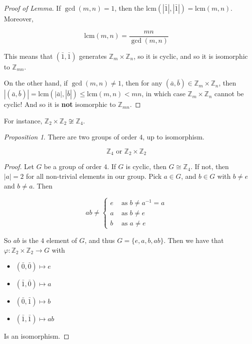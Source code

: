 \documentclass[12pt]{article}
\def\lcm{\text{lcm}}
\def\Z{{\mathbb Z}}
\theoremstyle{remark}
\newtheorem{proposition}{Proposition}
\theoremstyle{remark}
\theoremstyle{remark}
\theoremstyle{remark}
\theoremstyle{remark}
\begin{document}
\begin{proof}[Proof of Lemma]
  If $\gcd(m, n) = 1$, then the $\lcm(|\bar 1|, |\bar 1|) = \lcm(m, n)$. Moreover,

  \[
    \lcm(m, n) = \frac{mn}{\gcd(m, n)}
  \]

  This means that $(\bar 1, \bar 1)$ generates $\Z_m \times \Z_n$, so it is
  cyclic, and so it is isomorphic to $\Z_{mn}$.

  On the other hand, if $\gcd(m, n) \ne 1$, then for any $(\bar a, \bar b) \in
  \Z_m \times \Z_n$, then $|(\bar a, \bar b)| = \lcm(|\bar a|, |\bar b|) \le
  \lcm(m, n) < mn$, in which case $\Z_m \times \Z_n$ cannot be cyclic! And so it
  is {\bf not} isomorphic to $\Z_{mn}$.
\end{proof}

For instance, $\Z_2 \times \Z_2 \not\cong \Z_4$.

\begin{proposition}
  There are two groups of order $4$, up to isomorphism.

  \[
    \Z_4 \text{ or } \Z_2 \times \Z_2
  \]
\end{proposition}

\begin{proof}
  Let $G$ be a group of order $4$. If $G$ is cyclic, then $G \cong
  \Z_4$. If not, then $|a| = 2$ for all non-trivial elements in our group. Pick $a
  \in G$, and $b \in G$ with $b \ne e$ and $b \ne a$. Then

  \[
    ab \ne \begin{cases}
      e & \text{ as } b \ne a^{-1} = a \\
      a & \text{ as } b \ne e \\
      b & \text{ as } a \ne e
    \end{cases}
  \]

  So $ab$ is the $4$ element of $G$, and thus $G = \{e, a, b, ab\}$. Then we have
  that $\varphi: \Z_2 \times \Z_2 \to G$ with

  \begin{itemize}
    \item $(\bar 0, \bar 0) \mapsto e$
    \item $(\bar 1, \bar 0) \mapsto a$
    \item $(\bar 0, \bar 1) \mapsto b$
    \item $(\bar 1, \bar 1) \mapsto ab$
  \end{itemize}

  Is an isomorphism.
\end{proof}
\end{document}
